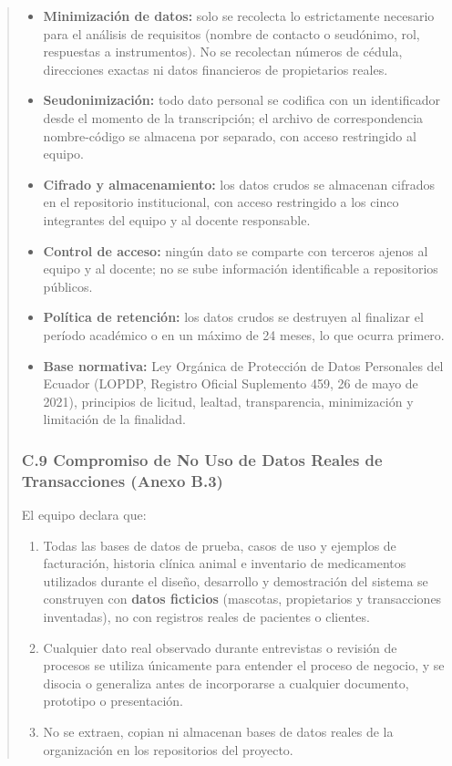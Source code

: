 \documentclass[
]{article}
\begin{document}
\begin{quote}
\begin{itemize}
  \item \textbf{Minimización de datos:} solo se recolecta lo estrictamente necesario para el análisis de requisitos (nombre de contacto o seudónimo, rol, respuestas a instrumentos). No se recolectan números de cédula, direcciones exactas ni datos financieros de propietarios reales.
  \item \textbf{Seudonimización:} todo dato personal se codifica con un identificador desde el momento de la transcripción; el archivo de correspondencia nombre-código se almacena por separado, con acceso restringido al equipo.
  \item \textbf{Cifrado y almacenamiento:} los datos crudos se almacenan cifrados en el repositorio institucional, con acceso restringido a los cinco integrantes del equipo y al docente responsable.
  \item \textbf{Control de acceso:} ningún dato se comparte con terceros ajenos al equipo y al docente; no se sube información identificable a repositorios públicos.
  \item \textbf{Política de retención:} los datos crudos se destruyen al finalizar el período académico o en un máximo de 24 meses, lo que ocurra primero.
  \item \textbf{Base normativa:} Ley Orgánica de Protección de Datos Personales del Ecuador (LOPDP, Registro Oficial Suplemento 459, 26 de mayo de 2021), principios de licitud, lealtad, transparencia, minimización y limitación de la finalidad.
\end{itemize}

\subsubsection{C.9 Compromiso de No Uso de Datos Reales de Transacciones (Anexo B.3)}\label{c9-no-uso-datos-reales}

El equipo declara que:

\begin{enumerate}
  \item Todas las bases de datos de prueba, casos de uso y ejemplos de facturación, historia clínica animal e inventario de medicamentos utilizados durante el diseño, desarrollo y demostración del sistema se construyen con \textbf{datos ficticios} (mascotas, propietarios y transacciones inventadas), no con registros reales de pacientes o clientes.
  \item Cualquier dato real observado durante entrevistas o revisión de procesos se utiliza únicamente para entender el proceso de negocio, y se disocia o generaliza antes de incorporarse a cualquier documento, prototipo o presentación.
  \item No se extraen, copian ni almacenan bases de datos reales de la organización en los repositorios del proyecto.
\end{enumerate}


\end{quote}
\end{document}
